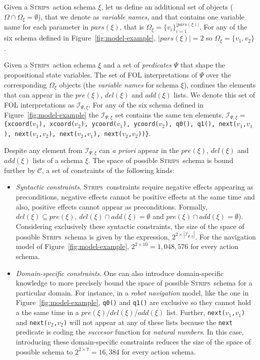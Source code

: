 \documentclass[letterpaper]{article} %
\newcommand{\strips}{\textsc{Strips}}     %
\begin{document}
Given a \strips\ action schema $\xi$, let us define an additional set of objects ($\Omega\cap\Omega_\xi=\emptyset$), that we denote as {\em variable names}, and that contains one variable name for each parameter in $pars(\xi)$, that is $\Omega_\xi=\{v_i\}_{i=1}^{|pars(\xi)|}$. For any of the six schema defined in Figure~\ref{fig:model-example}, $|pars(\xi)|=2$ so $\Omega_\xi=\{v_1,v_2\}$.

Given a \strips\ action schema $\xi$ and a set of {\em predicates} $\Psi$ that shape the propositional state variables. The set of FOL interpretations of $\Psi$ over the corresponding $\Omega_\xi$ objects (the {\em variable names} for schema $\xi$), confines the elements that can appear in the $pre(\xi)$, $del(\xi)$ and $add(\xi)$ lists. We denote this set of FOL interpretations as ${\mathcal I}_{\Psi,\xi}$. For any of the six schema defined in Figure~\ref{fig:model-example} the ${\mathcal I}_{\Psi,\xi}$ set contains the same ten elements, ${\mathcal I}_{\Psi,\xi}=${\small\tt\{xcoord($v_1$), xcoord($v_2$), ycoord($v_1$), ycoord($v_2$), q0(), q1(), next($v_1$,$v_1$), next($v_1$,$v_2$), next($v_2$,$v_1$), next($v_2$,$v_2$))\}}.

Despite any element from ${\mathcal I}_{\Psi,\xi}$ can {\em a priori} appear in the $pre(\xi)$, $del(\xi)$ and $add(\xi)$ lists of a schema $\xi$. The space of possible \strips\ schema is bound further by ${\mathcal C}$, a set of constraints of the following kinds: 
\begin{itemize}
\item {\em Syntactic constraints}. \strips\ constraints require negative effects appearing as preconditions, negative effects cannot be positive effects at the same time and also, positive effects cannot appear as preconditions. Formally, $del(\xi)\subseteq pre(\xi)$, $del(\xi)\cap add(\xi)=\emptyset$ and $pre(\xi)\cap add(\xi)=\emptyset$). Considering exclusively these syntactic constraints, the size of the space of possible \strips\ schema is given by the expression, $2^{2\times|{\mathcal I}_{\Psi,\xi}|}$. For the navigation model of Figure~\ref{fig:model-example}, $2^{2\times 10}=1,048,576$ for every action schema.
\item {\em Domain-specific constraints}. One can also introduce domain-specific knowledge to more precisely bound the space of possible \strips\ schema for a particular domain. For instance, in a {\em robot navigation} model, like the one in Figure~\ref{fig:model-example}, {\small\tt q0()} and {\small\tt q1()} are exclusive so they cannot hold a the same time in a $pre(\xi)$/$del(\xi)$/$add(\xi)$ list. Further, {\small\tt next($v_1$,$v_1$)} and {\small\tt next($v_2$,$v_2$)} will not appear at any of these lists because the {\tt\small next} predicate is coding the {\em succesor} function for {\em natural numbers}. In this case, introducing these domain-specific constraints reduces the size of the space of possible schema to $2^{2\times 7}=16,384$ for every action schema.
\end{itemize}
\end{document}
